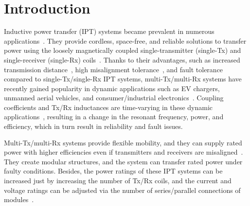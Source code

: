 \documentclass[journal]{IEEEtran}
\begin{document}
\section{Introduction} 
Inductive power transfer (IPT) systems became prevalent in numerous applications~\cite{heart_IPT,roadway,EV,battery,consumer}. 
They provide cordless, space-free, and reliable solutions to transfer power using the loosely magnetically coupled single-transmitter (single-Tx) and single-receiver (single-Rx) coils~\cite{free-positioning,robust}. 
Thanks to their advantages, such as increased transmission distance~\cite{increased_tr_dis}, high misalignment tolerance~\cite{misalinged_multicoil,misalignment_3coil}, and fault tolerance~\cite{fault_tolerant} compared to single-Tx/single-Rx IPT systems,
multi-Tx/multi-Rx systems have recently gained popularity in dynamic applications such as EV chargers, unmanned aerial vehicles, and consumer/industrial electronics~\cite{EV_dynamic,UAV,industrial}.
Coupling coefficients and Tx/Rx inductances are time-varying in these dynamic applications~\cite{variable_coupling}, resulting in a change in the resonant frequency, power, and efficiency, which in turn result in reliability and fault issues.

Multi-Tx/multi-Rx systems provide flexible mobility, and they can supply rated
power with higher efficiencies even if transmitters and receivers are misaligned~\cite{dynamic_flex,interoperable,uniform}.
They create modular structures, and the system can transfer rated power under faulty conditions.
Besides, the power ratings of these IPT systems can be increased just by increasing the number of Tx/Rx coils, and the current and voltage ratings can be adjusted via the number of series/parallel connections of modules~\cite{scalable,extendpower,SP-power}. 
\end{document}
